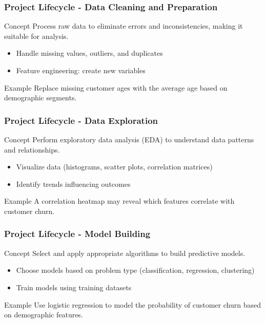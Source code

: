 \documentclass[aspectratio=169]{beamer}
\begin{document}
\begin{frame}[fragile]
    \frametitle{Project Lifecycle - Data Cleaning and Preparation}
    \begin{block}{Concept}
        Process raw data to eliminate errors and inconsistencies, making it suitable for analysis.
    \end{block}
    \begin{itemize}
        \item Handle missing values, outliers, and duplicates
        \item Feature engineering: create new variables
    \end{itemize}
    \begin{block}{Example}
        Replace missing customer ages with the average age based on demographic segments.
    \end{block}
\end{frame}

\begin{frame}[fragile]
    \frametitle{Project Lifecycle - Data Exploration}
    \begin{block}{Concept}
        Perform exploratory data analysis (EDA) to understand data patterns and relationships.
    \end{block}
    \begin{itemize}
        \item Visualize data (histograms, scatter plots, correlation matrices)
        \item Identify trends influencing outcomes 
    \end{itemize}
    \begin{block}{Example}
        A correlation heatmap may reveal which features correlate with customer churn.
    \end{block}
\end{frame}

\begin{frame}[fragile]
    \frametitle{Project Lifecycle - Model Building}
    \begin{block}{Concept}
        Select and apply appropriate algorithms to build predictive models.
    \end{block}
    \begin{itemize}
        \item Choose models based on problem type (classification, regression, clustering)
        \item Train models using training datasets
    \end{itemize}
    \begin{block}{Example}
        Use logistic regression to model the probability of customer churn based on demographic features.
    \end{block}
\end{frame}
\end{document}
